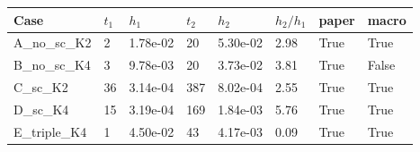 \begin{tabular}{llllllll}
\toprule
Case & $t_1$ & $h_1$ & $t_2$ & $h_2$ & $h_2/h_1$ & paper & macro \\
\midrule
A\_no\_sc\_K2 & 2 & 1.78e-02 & 20 & 5.30e-02 & 2.98 & True & True \\
B\_no\_sc\_K4 & 3 & 9.78e-03 & 20 & 3.73e-02 & 3.81 & True & False \\
C\_sc\_K2 & 36 & 3.14e-04 & 387 & 8.02e-04 & 2.55 & True & True \\
D\_sc\_K4 & 15 & 3.19e-04 & 169 & 1.84e-03 & 5.76 & True & True \\
E\_triple\_K4 & 1 & 4.50e-02 & 43 & 4.17e-03 & 0.09 & True & True \\
\bottomrule
\end{tabular}
